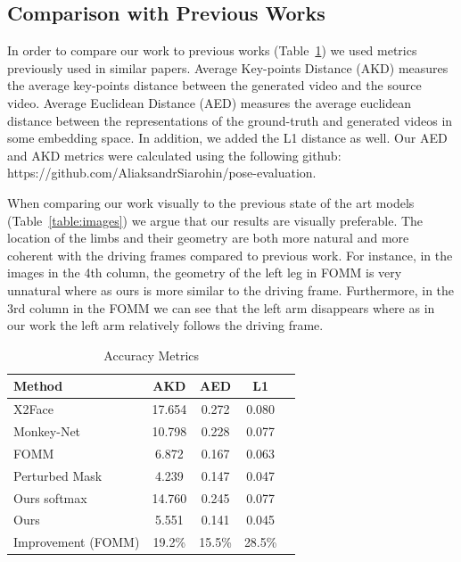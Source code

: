 \documentclass{article}
\begin{document}
\subsection{Comparison with Previous Works}
In order to compare our work to previous works (Table~\ref{table:results}) we used metrics previously used in similar papers. Average Key-points Distance \cite{cao2017realtime} (AKD) measures the average key-points distance between the generated video and the source video. Average Euclidean Distance \cite{zheng2019joint}  (AED) measures the average euclidean distance
 between the representations of the ground-truth and generated videos in some embedding space. In addition, we added the L1 distance as well. Our AED and AKD metrics were calculated using the following github: https://github.com/AliaksandrSiarohin/pose-evaluation.

 When comparing our work visually to the previous state of the art models (Table~\ref{table:images}) we argue that our results are visually preferable. The location of the limbs and their geometry are both more natural and more coherent with the driving frames compared to previous work. For instance, in the images in the 4th column, the geometry of the left leg in FOMM is very unnatural where as ours is more similar to the driving frame. Furthermore, in the 3rd column in the FOMM we can see that the left arm disappears where as in our work the left arm relatively follows the driving frame.



\begin{table}[t]
\caption{Accuracy Metrics}
\label{table:results}
\vskip 0.15in
\begin{center}
\begin{small}
\begin{sc}
\begin{tabular}{lcccr}
\toprule
Method & AKD & AED & L1 \\
\midrule
X2Face    & 17.654 & 0.272 & 0.080 \\
Monkey-Net    & 10.798 & 0.228 & 0.077 \\
FOMM    & 6.872 & 0.167 & 0.063 \\
Perturbed Mask & 4.239 & 0.147 & 0.047 \\
Ours softmax & 14.760& 0.245 & 0.077 \\
Ours & 5.551 & 0.141 &  0.045\\
\midrule
Improvement (FOMM)    & 19.2\% & 15.5\% & 28.5\% \\
\bottomrule
\end{tabular}
\end{sc}
\end{small}
\end{center}
\vskip -0.1in
\end{table}
\end{document}
